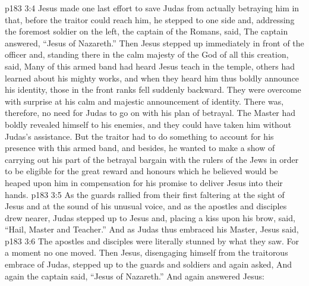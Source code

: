 \vs p183 3:4 Jesus made one last effort to save Judas from actually betraying him in that, before the traitor could reach him, he stepped to one side and, addressing the foremost soldier on the left, the captain of the Romans, said,  The captain answered, “Jesus of Nazareth.” Then Jesus stepped up immediately in front of the officer and, standing there in the calm majesty of the God of all this creation, said,  Many of this armed band had heard Jesus teach in the temple, others had learned about his mighty works, and when they heard him thus boldly announce his identity, those in the front ranks fell suddenly backward. They were overcome with surprise at his calm and majestic announcement of identity. There was, therefore, no need for Judas to go on with his plan of betrayal. The Master had boldly revealed himself to his enemies, and they could have taken him without Judas’s assistance. But the traitor had to do something to account for his presence with this armed band, and besides, he wanted to make a show of carrying out his part of the betrayal bargain with the rulers of the Jews in order to be eligible for the great reward and honours which he believed would be heaped upon him in compensation for his promise to deliver Jesus into their hands.
\vs p183 3:5 As the guards rallied from their first faltering at the sight of Jesus and at the sound of his unusual voice, and as the apostles and disciples drew nearer, Judas stepped up to Jesus and, placing a kiss upon his brow, said, “Hail, Master and Teacher.” And as Judas thus embraced his Master, Jesus said, 
\vs p183 3:6 The apostles and disciples were literally stunned by what they saw. For a moment no one moved. Then Jesus, disengaging himself from the traitorous embrace of Judas, stepped up to the guards and soldiers and again asked,  And again the captain said, “Jesus of Nazareth.” And again answered Jesus: 
